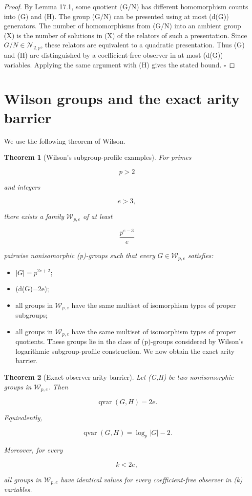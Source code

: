 \documentclass[11pt]{article}
\newtheorem{theorem}{Theorem}[section]
\begin{document}
\begin{proof}
By Lemma 17.1, some quotient (G/N) has different homomorphism counts into (G) and (H). The group (G/N) can be presented using at most (d(G)) generators. The number of homomorphisms from (G/N) into an ambient group (X) is the number of solutions in (X) of the relators of such a presentation. Since $G/N\in\mathcal N_{2,p}$, these relators are equivalent to a quadratic presentation. Thus (G) and (H) are distinguished by a coefficient-free observer in at most (d(G)) variables. Applying the same argument with (H) gives the stated bound. $\square$

\end{proof}

\section{Wilson groups and the exact arity barrier}

We use the following theorem of Wilson.

\begin{theorem}[Wilson's subgroup-profile examples]
For primes

\[
p>2
\]

and integers

\[
e>3,
\]

there exists a family $\mathcal W_{p,e}$ of at least

\[
\frac{p^{e-3}}{e}
\]

pairwise nonisomorphic (p)-groups such that every $G\in\mathcal W_{p,e}$ satisfies:

\end{theorem}

\begin{itemize}
\item $|G|=p^{2e+2}$;
\item (d(G)=2e);
\item all groups in $\mathcal W_{p,e}$ have the same multiset of isomorphism types of proper subgroups;
\item all groups in $\mathcal W_{p,e}$ have the same multiset of isomorphism types of proper quotients.
These groups lie in the class of (p)-groups considered by Wilson's logarithmic subgroup-profile construction. We now obtain the exact arity barrier.

\end{itemize}

\begin{theorem}[Exact observer arity barrier]
Let (G,H) be two nonisomorphic groups in $\mathcal W_{p,e}$. Then

\[
\operatorname{qvar}(G,H)=2e.
\]

Equivalently,

\[
\operatorname{qvar}(G,H)=\log_p|G|-2.
\]

Moreover, for every

\[
k<2e,
\]

all groups in $\mathcal W_{p,e}$ have identical values for every coefficient-free observer in (k) variables.

\end{theorem}
\end{document}

